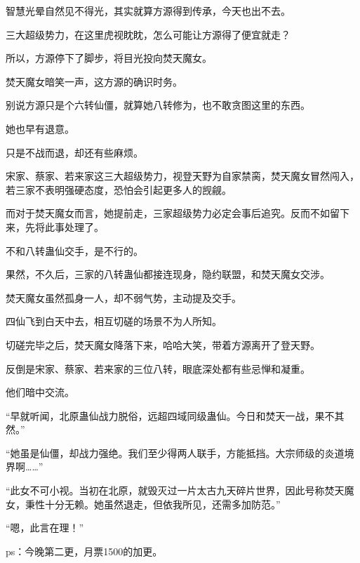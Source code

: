 \begin{this_body}
智慧光晕自然见不得光，其实就算方源得到传承，今天也出不去。

三大超级势力，在这里虎视眈眈，怎么可能让方源得了便宜就走？

所以，方源停下了脚步，将目光投向焚天魔女。

焚天魔女暗笑一声，这方源的确识时务。

别说方源只是个六转仙僵，就算她八转修为，也不敢贪图这里的东西。

她也早有退意。

只是不战而退，却还有些麻烦。

宋家、蔡家、若来家这三大超级势力，视登天野为自家禁脔，焚天魔女冒然闯入，若三家不表明强硬态度，恐怕会引起更多人的觊觎。

而对于焚天魔女而言，她提前走，三家超级势力必定会事后追究。反而不如留下来，先将此事处理了。

不和八转蛊仙交手，是不行的。

果然，不久后，三家的八转蛊仙都接连现身，隐约联盟，和焚天魔女交涉。

焚天魔女虽然孤身一人，却不弱气势，主动提及交手。

四仙飞到白天中去，相互切磋的场景不为人所知。

切磋完毕之后，焚天魔女降落下来，哈哈大笑，带着方源离开了登天野。

反倒是宋家、蔡家、若来家的三位八转，眼底深处都有些忌惮和凝重。

他们暗中交流。

“早就听闻，北原蛊仙战力脱俗，远超四域同级蛊仙。今日和焚天一战，果不其然。”

“她虽是仙僵，却战力强绝。我们至少得两人联手，方能抵挡。大宗师级的炎道境界啊……”

“此女不可小视。当初在北原，就毁灭过一片太古九天碎片世界，因此号称焚天魔女，秉性十分无赖。她虽然退走，但依我所见，还需多加防范。”

“嗯，此言在理！”

ps：今晚第二更，月票1500的加更。

\end{this_body}

